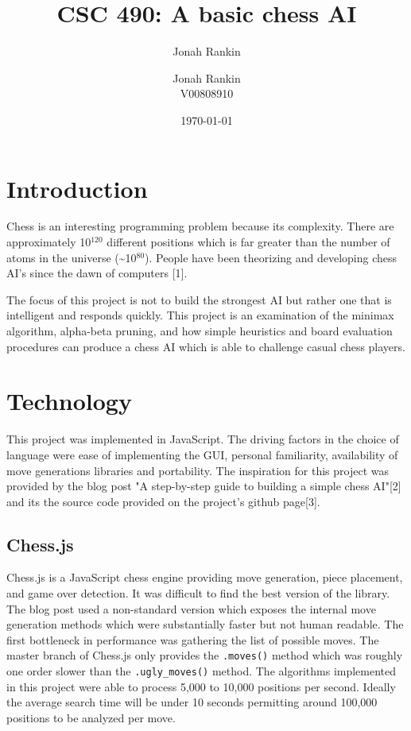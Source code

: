 \documentclass[11pt]{article}
\author{Jonah Rankin}
\date{\today}
\title{}
\begin{document}
\title{CSC 490: A basic chess AI}
\author{Jonah Rankin\\V00808910}
\maketitle

\section*{Introduction}
\label{sec:org1869a3e}
Chess is an interesting programming problem because its complexity. There are approximately 10\(^{\text{120}}\) different positions which is far greater than the number of atoms in the universe (\textasciitilde{}10\(^{\text{80}}\)). People have been theorizing and developing chess AI's since the dawn of computers [1].

\vspace{2.5mm}
The focus of this project is not to build the strongest AI but rather one that is intelligent and responds quickly. This project is an examination of the minimax algorithm, alpha-beta pruning, and how simple heuristics and board evaluation procedures can produce a chess AI which is able to challenge casual chess players.

\section*{Technology}
\label{sec:org2f445ac}
This project was implemented in JavaScript. The driving factors in the choice of language were ease of implementing the GUI, personal familiarity, availability of move generations libraries and portability. The inspiration for this project was provided by the blog post "A step-by-step guide to building a simple chess AI"[2] and its the source code provided on the project's github page[3]. 

\subsection*{Chess.js}
\label{sec:org26b1908}
Chess.js is a JavaScript chess engine providing move generation, piece placement, and game over detection. It was difficult to find the best version of the library. The blog post used a non-standard version which exposes the internal move generation methods which were substantially faster but not human readable. The first bottleneck in performance was gathering the list of possible moves. The master branch of Chess.js only provides the \texttt{.moves()} method which was roughly one order slower than the \texttt{.ugly\_moves()} method. The algorithms implemented in this project were able to process 5,000 to 10,000 positions per second. Ideally the average search time will be under 10 seconds permitting around 100,000 positions to be analyzed per move.
\end{document}
